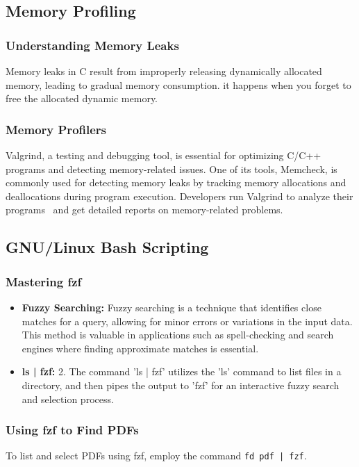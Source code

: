 \documentclass[12pt]{article}
\begin{document}
\subsection{Memory Profiling}
\subsubsection{Understanding Memory Leaks}
    Memory leaks in C result from improperly releasing dynamically allocated memory, leading to gradual memory consumption. it happens when you forget to free the allocated dynamic memory.

\subsubsection{Memory Profilers}
    Valgrind, a testing and debugging tool, is essential for optimizing C/C++ programs and detecting memory-related issues.  One of its tools, Memcheck, is commonly used
    for detecting memory leaks by tracking memory allocations and deallocations
    during program execution. Developers run Valgrind to analyze their programs
    ~and get detailed reports on memory-related problems.

\subsection{GNU/Linux Bash Scripting}
\subsubsection{Mastering fzf}
    \begin{itemize}
        \item \textbf{Fuzzy Searching:} Fuzzy searching is a technique that identifies close matches for a query, allowing for minor errors or variations in the input data. This method is valuable in applications such as spell-checking and search engines where finding approximate matches is essential.
        \item \textbf{ ls | fzf:}  2. The command 'ls | fzf' utilizes the 'ls' command to list files in a directory, and then pipes the output to 'fzf' for an interactive fuzzy search and selection process.
    \end{itemize}

\subsubsection{Using fzf to Find PDFs}
    To list and select PDFs using fzf, employ the command \texttt{fd pdf | fzf}.
\end{document}
